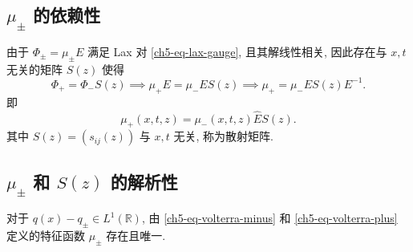 \subsection{$\mu_{\pm}$ 的依赖性}
由于 $ \Phi_{\pm} = \mu_{\pm} E $ 满足 Lax 对 \eqref{ch5-eq-lax-gauge}, 且其解线性相关, 因此存在与 $ x, t $ 无关的矩阵 $ S(z) $ 使得
\begin{equation}
    \Phi_{+} = \Phi_{-} S(z) \implies \mu_{+} E = \mu_{-} E S(z) \implies \mu_{+} = \mu_{-} E S(z) E^{-1}.
    \label{ch5-eq-scatter-phi}
\end{equation}
即
\begin{equation}
    \mu_{+}(x,t,z) = \mu_{-}(x,t,z) \hat{E} S(z).
    \label{ch5-eq-scatter-mu}
\end{equation}
其中 $ S(z) = (s_{ij}(z)) $ 与 $ x, t $ 无关, 称为散射矩阵.
\subsection{$\mu_{\pm}$ 和 $S(z)$ 的解析性}
\begin{theorem}
    对于 $ q(x) -q_{\pm} \in L^{1}(\mathbb{R}) $, 由 \eqref{ch5-eq-volterra-minus} 和 \eqref{ch5-eq-volterra-plus} 定义的特征函数 $ \mu_{\pm} $ 存在且唯一.
\end{theorem}
